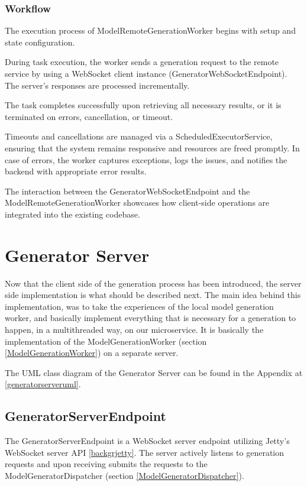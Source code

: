 			\subsubsection{Workflow}
				The execution process of ModelRemoteGenerationWorker begins with setup and state configuration. 

				During task execution, the worker sends a generation request to the remote service by using a WebSocket client instance (GeneratorWebSocketEndpoint). 
				The server's responses are processed incrementally.

				The task completes successfully upon retrieving all necessary results, or it is terminated on errors, cancellation, or timeout.

				Timeouts and cancellations are managed via a ScheduledExecutorService, ensuring that the system remains responsive and resources are freed promptly. In case of errors, the worker captures exceptions, logs the issues, and notifies the backend with appropriate error results.

				The interaction between the GeneratorWebSocketEndpoint and the ModelRemoteGenerationWorker 
				showcases how client-side operations are integrated into the existing codebase.

	\section{Generator Server} \label{Generator Server}
		Now that the client side of the generation process has been introduced, the server side implementation is what should be described next.
		The main idea behind this implementation, was to take the experiences of the local model generation worker, and basically implement everything that 
		is necessary for a generation to happen, in a multithreaded way, on our microservice. It is basically the implementation of 
		the ModelGenerationWorker (section \ref{ModelGenerationWorker}) on a separate server.

		The UML class diagram of the Generator Server can be found in the Appendix at \ref{generatorserveruml}.

		\subsection{GeneratorServerEndpoint} \label{GeneratorServerEndpoint}
			The GeneratorServerEndpoint is a WebSocket server endpoint utilizing Jetty's WebSocket server API \ref{backgrjetty}. 
			The server actively listens
			to generation requests and upon receiving submits the requests to the ModelGeneratorDispatcher 
			(section \ref{ModelGeneratorDispatcher}).

